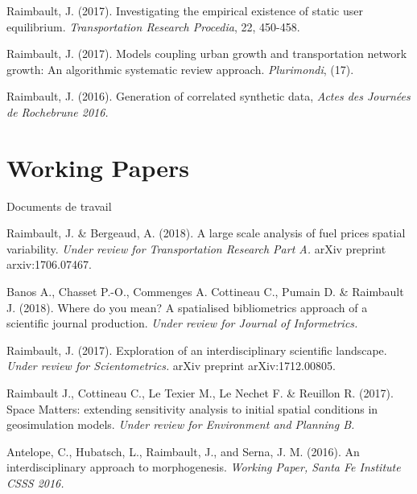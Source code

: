 \bigskip

\noindent Raimbault, J. (2017). Investigating the empirical existence of static user equilibrium. \textit{Transportation Research Procedia}, 22, 450-458. 


\bigskip

\noindent Raimbault, J. (2017). Models coupling urban growth and transportation network growth: An algorithmic systematic review approach. \textit{Plurimondi}, (17).


\bigskip


\noindent Raimbault, J. (2016). Generation of correlated synthetic data, \textit{Actes des Journ{\'e}es de Rochebrune 2016.}






\section*{Working Papers}{Documents de travail}



\noindent Raimbault, J. \& Bergeaud, A. (2018). A large scale analysis of fuel prices spatial variability. \textit{Under review for Transportation Research Part A.} arXiv preprint arxiv:1706.07467.


\bigskip

\noindent Banos A., Chasset P.-O., Commenges A. Cottineau C., Pumain D. \& Raimbault J. (2018). Where do you mean? A spatialised bibliometrics approach of a scientific journal production. \textit{Under review for Journal of Informetrics.}


\bigskip

\noindent Raimbault, J. (2017). Exploration of an interdisciplinary scientific landscape. \textit{Under review for Scientometrics.} arXiv preprint arXiv:1712.00805.

\bigskip

\noindent Raimbault J., Cottineau C., Le Texier M., Le Nechet F. \& Reuillon R.
 (2017). Space Matters: extending sensitivity analysis to initial spatial conditions in geosimulation models. \textit{Under review for Environment and Planning B.}

\bigskip

\noindent Antelope, C., Hubatsch, L., Raimbault, J., and Serna, J. M. (2016). An interdisciplinary approach to morphogenesis. \textit{Working Paper, Santa Fe Institute CSSS 2016.}





